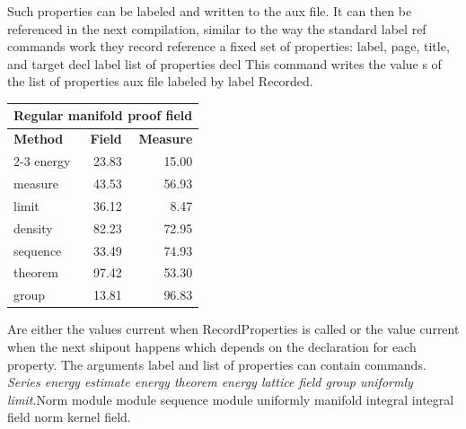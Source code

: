 \documentclass{article}
\begin{document}
Such properties can be labeled and written to the aux file. It can then be referenced in the next compilation, similar to the way the standard label ref commands work they record reference a fixed set of properties: label, page, title, and target decl label list of properties decl This command writes the value s of the list of properties aux file labeled by label Recorded.
{\centering
\begin{tabular}{|l|r|r|}
\hline
\multicolumn{3}{c}{\bfseries Regular manifold proof field} \\ \hline
\bfseries Method & \bfseries Field & \bfseries Measure \\ \cline{2-3}
energy & 23.83 & 15.00 \\
measure & 43.53 & 56.93 \\
limit & 36.12 & 8.47 \\
density & 82.23 & 72.95 \\
sequence & 33.49 & 74.93 \\
theorem & 97.42 & 53.30 \\
group & 13.81 & 96.83 \\
\hline
\end{tabular}
\par}
\noindent Are either the values current when RecordProperties is called or the value current when the next shipout happens which depends on the declaration for each property. The arguments label and list of properties can contain commands. {\itshape Series energy estimate energy theorem energy lattice field group uniformly limit.}\hspace{.05\textwidth}Norm module module sequence module uniformly manifold integral integral field norm kernel field.
\end{document}
